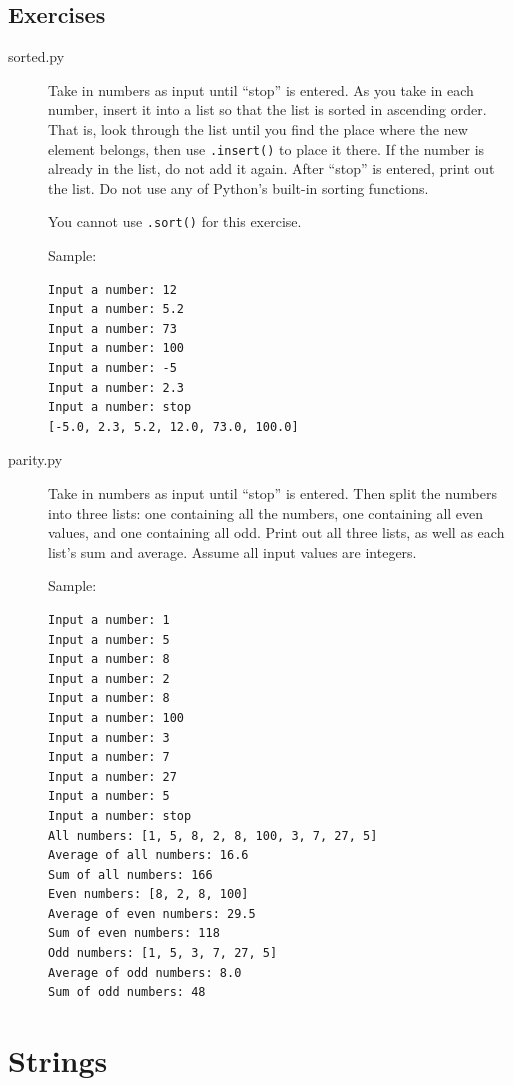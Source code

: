 \documentclass[11pt]{cselabheader}
\begin{document}
\subsection{Exercises}
\label{subsec:listsex}

\begin{description}
  \item[sorted.py] Take in numbers as input until ``stop'' is entered. As you
    take in each number, insert it into a list so that the list is sorted in
    ascending order. That is, look through the list until you find the place
    where the new element belongs, then use \lstinline{.insert()} to place it
    there. If the number is already in the list, do not add it again. After
    ``stop'' is entered, print out the list. Do not use any of Python's built-in
    sorting functions.

    You cannot use \lstinline!.sort()! for this exercise.

    Sample:
\begin{lstlisting}[style=ipython]
Input a number: 12
Input a number: 5.2
Input a number: 73
Input a number: 100
Input a number: -5
Input a number: 2.3
Input a number: stop
[-5.0, 2.3, 5.2, 12.0, 73.0, 100.0]
\end{lstlisting}

  \item[parity.py] Take in numbers as input until ``stop'' is entered. Then split the numbers into three lists: one containing all the numbers, one containing all even values, and one containing all odd. Print out all three lists, as well as each list's sum and average. Assume all input values are integers.

    Sample:
\begin{lstlisting}[style=bash]
Input a number: 1
Input a number: 5
Input a number: 8
Input a number: 2
Input a number: 8
Input a number: 100
Input a number: 3
Input a number: 7
Input a number: 27
Input a number: 5
Input a number: stop
All numbers: [1, 5, 8, 2, 8, 100, 3, 7, 27, 5]
Average of all numbers: 16.6
Sum of all numbers: 166
Even numbers: [8, 2, 8, 100]
Average of even numbers: 29.5
Sum of even numbers: 118
Odd numbers: [1, 5, 3, 7, 27, 5]
Average of odd numbers: 8.0
Sum of odd numbers: 48
\end{lstlisting}
\end{description}

\pagebreak
\section{Strings}
\end{document}
